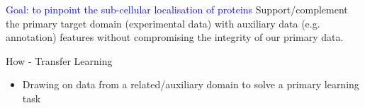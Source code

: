 \documentclass[bigger]{beamer}
\begin{document}

\begin{frame}

  \begin{block} \large \textcolor{Blue}{Goal: to pinpoint the sub-cellular localisation of proteins}
  Support/complement the primary target domain (experimental data)
  with auxiliary data (e.g. annotation) features without compromising the
  integrity of our primary data.
  \end{block}
  \bigskip
  
  \begin{block}{How - Transfer Learning}
  \begin{itemize}
  \item Drawing on data from a related/auxiliary domain to solve a primary learning task
  \end{itemize}
  \end{block}

\end{frame}

\end{document}
